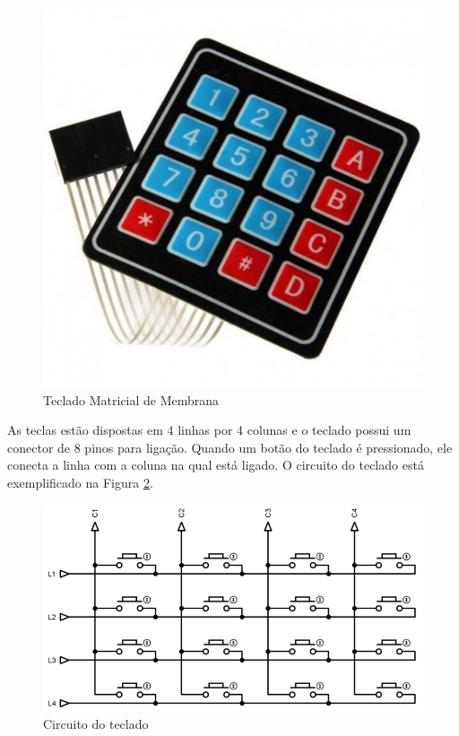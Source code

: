 \begin{figure}[htbp]
	\centering
	\includegraphics[scale=0.2]{figuras/teclado-matricial.jpg}
	\caption{Teclado Matricial de Membrana}
	\label{fig:teclado}
\end{figure}
	
\newpage

As teclas estão dispostas em 4 linhas por 4 colunas e o teclado possui um conector de 8 pinos para ligação. Quando um botão do teclado é pressionado, ele conecta a linha com a coluna na qual está ligado. O circuito do teclado está exemplificado na Figura \ref{fig:teclado-conexoes}.

\begin{figure}[htbp]
	\centering
	\includegraphics[scale=0.4]{figuras/matrix-1024x558.png}
	\caption{Circuito do teclado}
	\label{fig:teclado-conexoes}
\end{figure}

